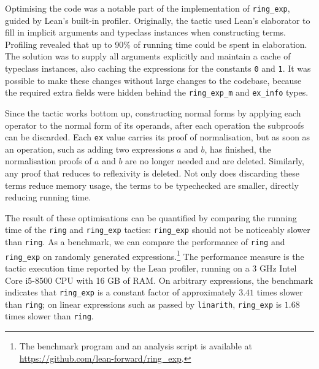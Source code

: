 \documentclass{llncs}
\newcommand{\lean}[1]{\texttt{#1}\xspace} %
\newcommand{\ring}{\lean{ring}}
\newcommand{\ringexp}{\lean{ring\_exp}}
\begin{document}
Optimising the code was a notable part of the implementation of \ringexp,
guided by Lean's built-in profiler.
Originally, the tactic used Lean's elaborator to fill in implicit arguments and typeclass instances when constructing terms.
Profiling revealed that up to 90\% of running time could be spent in elaboration.
The solution was to supply all arguments explicitly and maintain a cache of typeclass instances,
also caching the expressions for the constants \lean{0} and \lean{1}.
It was possible to make these changes without large changes to the codebase,
because the required extra fields were hidden behind the \lean{ring\_exp\_m} and \lean{ex\_info} types.

Since the tactic works bottom up,
constructing normal forms by applying each operator to the normal form of its operands,
after each operation the subproofs can be discarded.
Each \lean{ex} value carries its proof of normalisation,
but as soon as an operation, such as adding two expressions $a$ and $b$, has finished,
the normalisation proofs of $a$ and $b$ are no longer needed and are deleted.
Similarly, any proof that reduces to reflexivity is deleted.
Not only does discarding these terms reduce memory usage,
the terms to be typechecked are smaller, directly reducing running time.


The result of these optimisations can be quantified by comparing the running time
of the \lean{ring} and \ringexp tactics: \ringexp should not be noticeably slower than \lean{ring}.
As a benchmark, we can compare the performance of \ring and \ringexp on randomly generated expressions.\footnote{The benchmark program and an analysis script is available at \url{https://github.com/lean-forward/ring_exp}.}
The performance measure is the tactic execution time reported by the Lean profiler,
running on a 3 GHz Intel\textregistered\xspace Core\texttrademark\xspace i5-8500 CPU with 16 GB of RAM.
On arbitrary expressions, the benchmark indicates that \ringexp is a constant factor of approximately $3.41$ times slower than \ring;
on linear expressions such as passed by \lean{linarith}, 
\ringexp is $1.68$ times slower than \ring.
\end{document}
